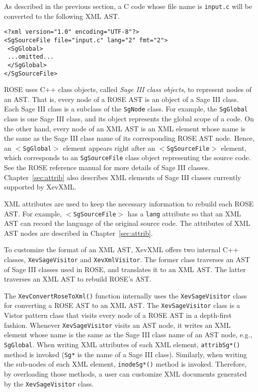 As described in the previous section, a C code whose file name is
\texttt{input.c} will be converted to the following XML AST.
\vspace{5mm}
\begin{verbatim}
<?xml version="1.0" encoding="UTF-8"?>
<SgSourceFile file="input.c" lang="2" fmt="2">
 <SgGlobal>
 ...omitted...
 </SgGlobal>
</SgSourceFile>
\end{verbatim}
\vspace{5mm}
ROSE uses C++ class objects, called \emph{Sage III class objects}, to
represent nodes of an AST.  That is, every node of a ROSE AST is an
object of a Sage III class. Each Sage III class is a subclass of the
\texttt{SgNode} class.  For example, the \texttt{SgGlobal} class is one
Sage III class, and its object represents the global scope of a code.
On the other hand, every node of an XML AST is an XML element whose name
is the same as the Sage III class name of its corresponding ROSE AST
node.  Hence, an \texttt{$<$SgGlobal$>$} element appears right after an
\texttt{$<$SgSourceFile$>$} element, which corresponds to an
\texttt{SgSourceFile} class object representing the source code.  See
the ROSE reference manual\cite{rose} for more details of Sage III
classes. Chapter~\ref{sec:attrib} also describes XML elements of Sage
III classes currently supported by XevXML.

XML attributes are used to keep the necessary information to rebuild
each ROSE AST. For example, \texttt{$<$SgSourceFile$>$} has a
\texttt{lang} attribute so that an XML AST can record the language of
the original source code.  The attributes of XML AST nodes are described
in Chapter~\ref{sec:attrib}.

To customize the format of an XML AST, XevXML offers two internal C++
classes, \texttt{XevSageVisitor} and \texttt{XevXmlVisitor}.  The former
class traverses an AST of Sage III classes used in ROSE, and translates
it to an XML AST.  The latter traverses an XML AST to rebuild ROSE's
AST.

The \texttt{XevConvertRoseToXml()} function internally uses the
\texttt{XevSageVisitor} class for converting a ROSE AST to an XML AST.
The \texttt{XevSageVisitor} class is a Vistor pattern class that visits
every node of a ROSE AST in a depth-first fashion. Whenever
\texttt{XevSageVisitor} visits an AST node, it writes an XML element
whose name is the same as the Sage III class name of an AST node, e.g.,
\texttt{SgGlobal}.  When writing XML attributes of each XML element,
\texttt{attribSg*()} method is invoked (\texttt{Sg*} is the name of a
Sage III class). Similarly, when writing the sub-nodes of each XML
element, \texttt{inodeSg*()} method is invoked.  Therefore, by
overloading those methods, a user can customize XML documents generated
by the \texttt{XevSageVisitor} class.


